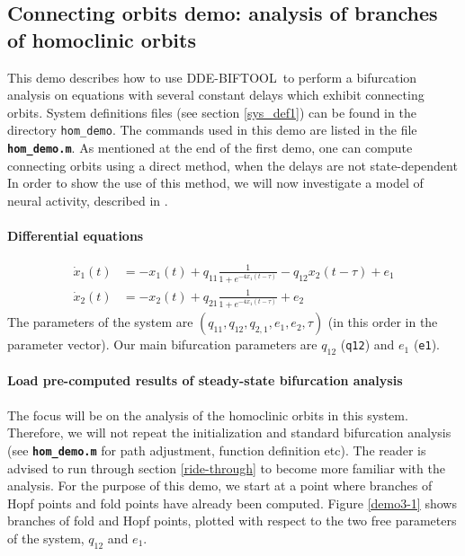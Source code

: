 \documentclass[10pt]{scrartcl}
\newcommand{\DDEBIFCODE}{\textsc{DDE-BIFTOOL}}
\newcommand{\file}[1]{\textbf{\texttt{#1}}}
\newcommand{\blist}[1]{\mbox{\lstinline!#1!}}
\begin{document}
\subsection{Connecting orbits demo: analysis of branches of homoclinic
  orbits}\label{demo3}
This demo describes how to use \DDEBIFCODE\ to perform a bifurcation
analysis on equations with several constant delays which exhibit
connecting orbits.  System definitions files (see section
\ref{sys_def1}) can be found in the directory \texttt{hom\_demo}.  The
commands used in this demo are listed in the file \file{hom\_demo.m}.
As mentioned at the end of the first demo, one can compute connecting
orbits using a direct method, when the delays are not state-dependent
In order to show the use of this method, we will now investigate a
model of neural activity, described in \cite{zapp}.  

\paragraph{Differential equations}
\begin{equation}\label{z}
  \begin{split}
    \dot{x}_{1}(t)&=-x_{1}(t)+q_{11}\frac{1}{1+e^{-4x_{1}(t-\tau)}}-q_{12}x_2(t-\tau) +e_1\\
    \dot{x}_{2}(t)&=-x_2(t)+q_{21}\frac{1}{1+e^{-4x_{1}(t-\tau)}}+e_2
  \end{split}
\end{equation}
The parameters of the system are
$(q_{11},q_{12},q_{2,1},e_1,e_2,\tau)$ (in this order in the parameter
vector). Our main bifurcation parameters are $q_{12}$ (\blist{q12})
and $e_1$ (\blist{e1}).
\paragraph{Load pre-computed results of steady-state bifurcation analysis}
The focus will be on the analysis of the homoclinic orbits in this
system.  Therefore, we will not repeat the initialization and standard
bifurcation analysis (see \file{hom\_demo.m} for path adjustment,
function definition etc).  The reader is advised to run through
section \ref{ride-through} to become more familiar with the analysis.
For the purpose of this demo, we start at a point where branches of
Hopf points and fold points have already been computed. Figure
\ref{demo3-1} shows branches of fold and Hopf points, plotted with
respect to the two free parameters of the system, $q_{12}$ and $e_1$.
\end{document}
